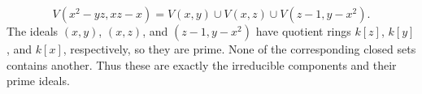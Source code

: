 \[V(x^2-yz,xz-x)=V(x,y)\cup V(x,z)\cup V(z-1,y-x^2).\]
The ideals $(x,y)$, $(x,z)$, and $(z-1,y-x^2)$ have quotient rings $k[z]$, $k[y]$, and $k[x]$, respectively, so they are prime. None of the corresponding closed sets contains another. Thus these are exactly the irreducible components and their prime ideals.
